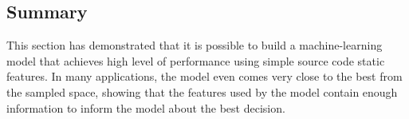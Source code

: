 \subsection{Summary}

This section has demonstrated that it is possible to build a machine-learning model that achieves high level of performance using simple source code static features.
In many applications, the model even comes very close to the best from the sampled space, showing that the features used by the model contain enough information to inform the model about the best decision.

\vspace{5mm}
